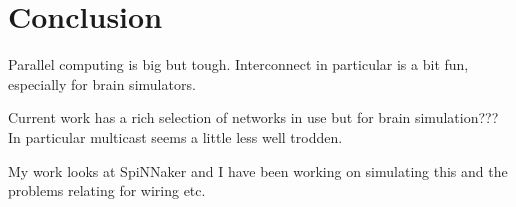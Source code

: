 \chapter{Conclusion}
	
	Parallel computing is big but tough. Interconnect in particular is a bit fun,
	especially for brain simulators.
	
	Current work has a rich selection of networks in use but for brain
	simulation??? In particular multicast seems a little less well trodden.
	
	My work looks at SpiNNaker and I have been working on simulating this and the
	problems relating for wiring etc.
